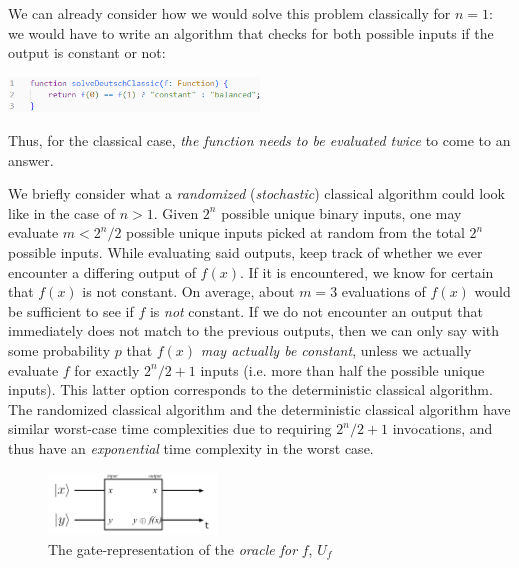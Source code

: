 \documentclass[conference]{IEEEtran}
\begin{document}
We can already consider how we would solve this problem classically for $n=1$:
we would have to write an algorithm that checks for both possible inputs if the output is constant or not: \\

\centerline{
    \includegraphics[width=0.5\textwidth]{img/deutsch_classic.png}
}

Thus, for the classical case, \textit{the function needs to be evaluated twice} to come to an answer.

We briefly consider what a \textit{randomized} (\textit{stochastic}) classical algorithm could look like in the case of $n>1$.
Given $2^n$ possible unique binary inputs, one may evaluate $m < 2^n/2$ possible unique inputs picked at random from the total $2^n$ possible inputs.
While evaluating said outputs, keep track of whether we ever encounter a differing output of $f(x)$.
If it is encountered, we know for certain that $f(x)$ is not constant.
On average, about $m=3$ evaluations of $f(x)$ would be sufficient to see if $f$ is \textit{not} constant.
If we do not encounter an output that immediately does not match to the previous outputs,
then we can only say with some probability $p$ that $f(x)$ \textit{may actually be constant},
unless we actually evaluate $f$ for exactly $2^n/2 + 1$ inputs (i.e. more than half the possible unique inputs).
This latter option corresponds to the deterministic classical algorithm.
The randomized classical algorithm and the deterministic classical algorithm have
similar worst-case time complexities due to requiring $2^n/2+1$ invocations, and thus have an \textit{exponential} time complexity in the worst case.%

\begin{figure}[tbp]
    \centerline{
        \includegraphics[width=0.4\textwidth]{img/oracle_of_f.png}
    }
    \caption{The gate-representation of the \textit{oracle for} $f$, $U_{f}$}
    \label{fig:oracleForFGate}
\end{figure}
\end{document}

